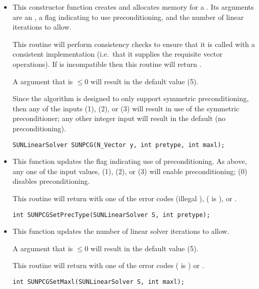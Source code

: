 \begin{itemize}


\item {}

  This constructor function creates and allocates memory for a {\pcg}
  .  Its arguments are an {\nvector}, a flag
  indicating to use preconditioning, and the number of linear
  iterations to allow. 

  This routine will perform consistency checks to ensure that it is
  called with a consistent {\nvector} implementation (i.e.~that it
  supplies the requisite vector operations).  If  is
  incompatible then this routine will return .

  A  argument that is $\le0$ will result in the default
  value (5).

  Since the {\pcg} algorithm is designed to only support symmetric
  preconditioning, then any of the  inputs 
  (1),  (2), or  (3) will result in use
  of the symmetric preconditioner;  any other integer input will
  result in the default (no preconditioning).

  \verb|SUNLinearSolver SUNPCG(N_Vector y, int pretype, int maxl);|


\item {}

  This function updates the flag indicating use of preconditioning.
  As above, any one of the input values,  (1),
   (2), or  (3) will enable
  preconditioning;  (0) disables preconditioning.

  This routine will return with one of the error codes
   (illegal ), 
  ( is ), or .
  
  \verb|int SUNPCGSetPrecType(SUNLinearSolver S, int pretype);|


\item {}

  This function updates the number of linear solver iterations to
  allow. 

  A  argument that is $\le0$ will result in the default
  value (5).

  This routine will return with one of the error codes
   ( is ) or .
  
  \verb|int SUNPCGSetMaxl(SUNLinearSolver S, int maxl);|

\end{itemize}
